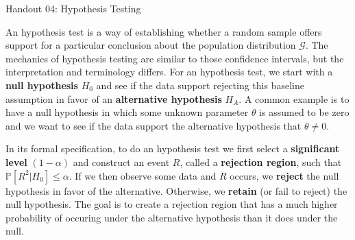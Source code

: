 \documentclass{tufte-handout}
\newcommand{\Prob}{\mathbb{P}}
\begin{document}
\justify

{\LARGE Handout 04: Hypothesis Testing}

\vspace*{18pt}

\noindent
An hypothesis test is a way of establishing whether a random sample
offers support for a particular conclusion about the population 
distribution $\mathcal{G}$. The mechanics of hypothesis testing are
similar to those confidence intervals, but the interpretation and
terminology differs. For an hypothesis test, we start with a
\textbf{null hypothesis} $H_0$ and see if the data support rejecting
this baseline assumption in favor of an \textbf{alternative hypothesis}
$H_A$. A common example is to have a null hypothesis in which some unknown
parameter $\theta$ is assumed to be zero and we want to see if the data 
support the alternative hypothesis that $\theta \neq 0$.

In its formal specification, to do an hypothesis test we first select
a \textbf{significant level} $(1-\alpha)$ and construct an event $R$,
called a \textbf{rejection region}, such that $\Prob[R^2 | H_0] \leq \alpha$.
If we then observe some data and $R$ occurs, we \textbf{reject} the
null hypothesis in favor of the alternative. Otherwise, we \textbf{retain}
(or fail to reject) the null hypothesis. The goal is to create a rejection
region that has a much higher probability of occuring under the alternative
hypothesis than it does under the null.
\end{document}

